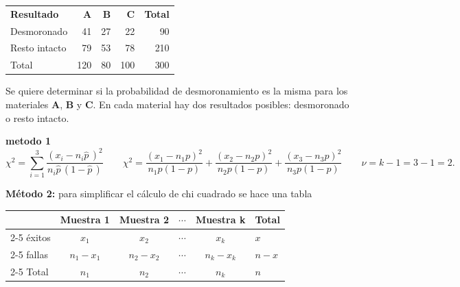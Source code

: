 \documentclass[10pt,a4paper]{article}
\begin{document}
\begin{center}
\vspace{-6pt}
\vspace{-8pt}
\end{center}

\begin{center}
\vspace{-4pt}
\begin{tabular}{l r r r r}
\toprule
\rowcolor{cyan!10} \textbf{Resultado} & \textbf{A} & \textbf{B} & \textbf{C} & \textbf{Total} \\
Desmoronado & 41 & 27 & 22 & 90 \\
Resto intacto & 79 & 53 & 78 & 210 \\
\midrule
Total & 120 & 80 & 100 & 300 \\
\bottomrule
\end{tabular}
\end{center}

Se quiere determinar si la probabilidad de desmoronamiento es la misma para los materiales \textbf{A}, \textbf{B} y \textbf{C}. En cada material hay dos resultados posibles: desmoronado o resto intacto.

\textbf{metodo 1}
\[
\chi^2 = \sum_{i=1}^{3} \frac{\left(x_i - n_i\widehat{p}\,\right)^2}{n_i\widehat{p}\,(1-\widehat{p}\,)}
\qquad
\chi^2 = \frac{(x_1-n_1p)^2}{n_1p(1-p)} + \frac{(x_2-n_2p)^2}{n_2p(1-p)} + \frac{(x_3-n_3p)^2}{n_3p(1-p)}
\qquad
\nu = k-1 = 3-1 = 2.
\]

\textbf{Método 2:} para simplificar el cálculo de chi cuadrado se hace una tabla

\begin{center}
\vspace{-4pt}
\begin{tabular}{l | c | c | c | c | l}
 & Muestra 1 & Muestra 2 & $\cdots$ & Muestra k & Total \\
\cline{2-5}
éxitos & $x_1$ & $x_2$ & $\cdots$ & $x_k$ & $x$ \\
\cline{2-5}
fallas & $n_1 - x_1$ & $n_2 - x_2$ & $\cdots$ & $n_k - x_k$ & $n-x$ \\
\cline{2-5}
Total & $n_1$ & $n_2$ & $\cdots$ & $n_k$ & $n$ \\
\end{tabular}
\vspace{-6pt}
\end{center}
\end{document}
